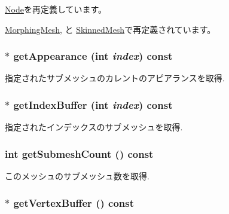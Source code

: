\hyperlink{classm3g_1_1Node_0b9f7531a4b56d34f47aeb1fff0d37e0}{Node}を再定義しています。

\hyperlink{classm3g_1_1MorphingMesh_7e7b2c3c4c988c6341a5e249bd468f57}{MorphingMesh}, と \hyperlink{classm3g_1_1SkinnedMesh_d3f422cf7656b73687d789094c7eae42}{SkinnedMesh}で再定義されています。\hypertarget{classm3g_1_1Mesh_4950a19e02c022dcf41a086117eb8219}{
\subsubsection[{getAppearance}]{ $\ast$ getAppearance (int {\em index}) const}}
\label{classm3g_1_1Mesh_4950a19e02c022dcf41a086117eb8219}


指定されたサブメッシュのカレントのアピアランスを取得. \hypertarget{classm3g_1_1Mesh_ca34a663f46ce20e2b894c046714ea1d}{
\subsubsection[{getIndexBuffer}]{ $\ast$ getIndexBuffer (int {\em index}) const}}
\label{classm3g_1_1Mesh_ca34a663f46ce20e2b894c046714ea1d}


指定されたインデックスのサブメッシュを取得. \hypertarget{classm3g_1_1Mesh_5dc5a57ad549eb97504c2a1280a882dd}{
\subsubsection[{getSubmeshCount}]{\setlength{\rightskip}{0pt plus 5cm}int getSubmeshCount () const}}
\label{classm3g_1_1Mesh_5dc5a57ad549eb97504c2a1280a882dd}


このメッシュのサブメッシュ数を取得. \hypertarget{classm3g_1_1Mesh_7602e9bf450fa8b3ec3c60e2e88cba25}{
\subsubsection[{getVertexBuffer}]{ $\ast$ getVertexBuffer () const}}
\label{classm3g_1_1Mesh_7602e9bf450fa8b3ec3c60e2e88cba25}


